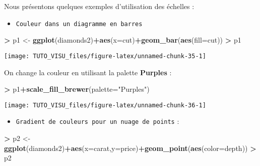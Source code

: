 \documentclass[]{article}
\newenvironment{Shaded}{\begin{snugshade}}{\end{snugshade}}
\newcommand{\DataTypeTok}[1]{\textcolor[rgb]{0.13,0.29,0.53}{#1}}
\newcommand{\KeywordTok}[1]{\textcolor[rgb]{0.13,0.29,0.53}{\textbf{#1}}}
\newcommand{\NormalTok}[1]{#1}
\newcommand{\OperatorTok}[1]{\textcolor[rgb]{0.81,0.36,0.00}{\textbf{#1}}}
\newcommand{\StringTok}[1]{\textcolor[rgb]{0.31,0.60,0.02}{#1}}
\providecommand{\tightlist}{%
  \setlength{\itemsep}{0pt}\setlength{\parskip}{0pt}}
\theoremstyle{definition}
\theoremstyle{definition}
\theoremstyle{definition}
\theoremstyle{remark}
\begin{document}
Nous présentons quelques exemples d'utilisation des échelles :

\begin{itemize}
\tightlist
\item
  \texttt{Couleur\ dans\ un\ diagramme\ en\ barres}
\end{itemize}

\begin{Shaded}
\begin{Highlighting}[]
\OperatorTok{>}\StringTok{ }\NormalTok{p1 <-}\StringTok{ }\KeywordTok{ggplot}\NormalTok{(diamonds2)}\OperatorTok{+}\KeywordTok{aes}\NormalTok{(}\DataTypeTok{x=}\NormalTok{cut)}\OperatorTok{+}\KeywordTok{geom_bar}\NormalTok{(}\KeywordTok{aes}\NormalTok{(}\DataTypeTok{fill=}\NormalTok{cut))}
\OperatorTok{>}\StringTok{ }\NormalTok{p1}
\end{Highlighting}
\end{Shaded}

\begin{center}\texttt{[image: TUTO\_VISU\_files/figure-latex/unnamed-chunk-35-1]} \end{center}

On change la couleur en utilisant la palette \textbf{Purples} :

\begin{Shaded}
\begin{Highlighting}[]
\OperatorTok{>}\StringTok{ }\NormalTok{p1}\OperatorTok{+}\KeywordTok{scale_fill_brewer}\NormalTok{(}\DataTypeTok{palette=}\StringTok{"Purples"}\NormalTok{)}
\end{Highlighting}
\end{Shaded}

\begin{center}\texttt{[image: TUTO\_VISU\_files/figure-latex/unnamed-chunk-36-1]} \end{center}

\begin{itemize}
\tightlist
\item
  \texttt{Gradient\ de\ couleurs\ pour\ un\ nuage\ de\ points} :
\end{itemize}

\begin{Shaded}
\begin{Highlighting}[]
\OperatorTok{>}\StringTok{ }\NormalTok{p2 <-}\StringTok{ }\KeywordTok{ggplot}\NormalTok{(diamonds2)}\OperatorTok{+}\KeywordTok{aes}\NormalTok{(}\DataTypeTok{x=}\NormalTok{carat,}\DataTypeTok{y=}\NormalTok{price)}\OperatorTok{+}\KeywordTok{geom_point}\NormalTok{(}\KeywordTok{aes}\NormalTok{(}\DataTypeTok{color=}\NormalTok{depth))}
\OperatorTok{>}\StringTok{ }\NormalTok{p2}
\end{Highlighting}
\end{Shaded}
\end{document}
